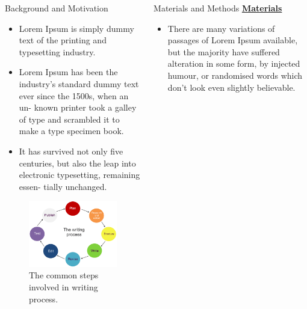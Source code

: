 \documentclass[20pt]{beamer}
\begin{document}
\begin{frame}[t]
\begin{columns}[t]
\begin{column}{0.32\linewidth}
\begin{block}{Background and Motivation}
\begin{itemize}
\item Lorem Ipsum is simply dummy text of the printing
 and typesetting industry.

\item Lorem Ipsum has been the industry’s standard
 dummy text ever since the 1500s, when an un-
 known printer took a galley of type and scrambled
 it to make a type specimen book.

\item It has survived not only five centuries, but also the
 leap into electronic typesetting, remaining essen-
 tially unchanged.
\end{itemize}

\vskip2cm 

\begin{figure}
	\includegraphics[width=\linewidth]{wp}
	\caption{The common steps involved in writing process.}
\end{figure}	

\vspace{12.5cm}	
\end{block}		
\end{column}		

\begin{column}{0.32\linewidth}
	\begin{block}{Materials and Methods}
	\textbf{\underline{Materials}}	

\begin{itemize}
	\item There are many variations of passages of Lorem
	Ipsum available, but the majority have suffered
	alteration in some form, by injected humour, or
	randomised words which don’t look even slightly
	believable.
	

\end{itemize}
\end{block}
\end{column}
\end{columns}
\end{frame}
\end{document}
